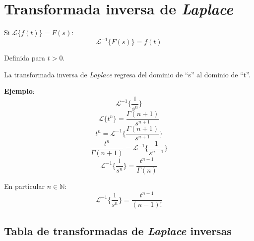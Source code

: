 \chapter{Transformada inversa de \emph{Laplace}}

Si $\mathcal{L}\{f(t)\}=F(s)$:
\begin{equation}
    \mathcal{L}^{-1}\{F(s)\}=f(t)
\end{equation}

Definida para $t>0$.

La transformada inversa de \emph{Laplace} regresa del dominio de ``s'' al
dominio de ``t''.

\textbf{Ejemplo}:
\begin{equation*}
    \mathcal{L}^{-1}\biggl\{\frac{1}{s^n}\biggl\}
\end{equation*}
\begin{equation*}
    \mathcal{L}\{t^n\}=\frac{\Gamma(n+1)}{s^{n+1}}
\end{equation*}
\begin{equation*}
    t^n=\mathcal{L}^{-1}\biggl\{\frac{\Gamma(n+1)}{s^{n+1}}\biggl\}
\end{equation*}
\begin{equation*}
    \frac{t^n}{\Gamma(n+1)}=\mathcal{L}^{-1}\biggl\{\frac{1}{s^{n+1}}\biggl\}
\end{equation*}
\begin{equation}
    \mathcal{L}^{-1}\biggl\{\frac{1}{s^n}\biggl\}=\frac{t^{n-1}}{\Gamma(n)}
\end{equation}

En particular $n\in\mathbb{N}$:
\begin{equation}
    \mathcal{L}^{-1}\biggl\{\frac{1}{s^n}\biggl\}=\frac{t^{n-1}}{(n-1)!}
\end{equation}

\section{Tabla de transformadas de \emph{Laplace} inversas}

